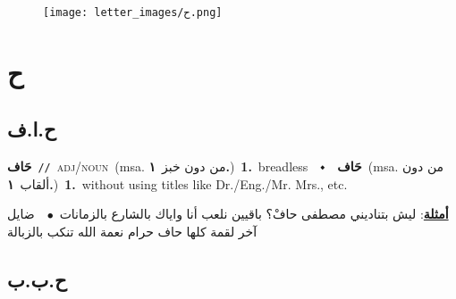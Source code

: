 \documentclass[10pt,a4paper,twoside]{article} %
\begin{document}
\begin{figure*}[t!]\centering\texttt{[image: letter\_images/ح.png]}\end{figure*}
\color{white}

 \section*{\foreignlanguage{arabic}{ح}} 
 \begin{multicols}{2} 

%
\color{black}
\vspace{-3mm}
\subsection*{\color{blue}\foreignlanguage{arabic}{ح.ا.ف}\color{blue}{ (ntws)}} 

{\setlength\topsep{0pt}\textbf{\foreignlanguage{arabic}{حَاف}}\ {\color{gray}\texttt{//}\color{black}}\ \textsc{adj/noun}\ \color{gray}(msa. \foreignlanguage{arabic}{من دون خبز}~\foreignlanguage{arabic}{\textbf{١.}})\color{black}\ \textbf{1.}~breadless\ \ $\smblkdiamond$\ \ \setlength\topsep{0pt}\textbf{\foreignlanguage{arabic}{حَاف}}\ \color{gray}(msa. \foreignlanguage{arabic}{من دون ألقاب}~\foreignlanguage{arabic}{\textbf{١.}})\color{black}\ \textbf{1.}~without using titles like Dr./Eng./Mr. Mrs., etc.\  \begin{flushright}\color{gray}\foreignlanguage{arabic}{\textbf{\underline{\foreignlanguage{arabic}{أمثلة}}}: ليش بتناديني مصطفى حافْ؟ باقيين نلعب أنا واياك بالشارع بالزمانات\ $\bullet$\ \  ضايل آخر لقمة كلها حاف حرام نعمة الله تنكب بالزبالة}\end{flushright}\color{black}} \vspace{2mm}

\vspace{-3mm}
\subsection*{\color{blue}\foreignlanguage{arabic}{ح.ب.ب}\color{blue}{}} 


\end{multicols}
\end{document}
